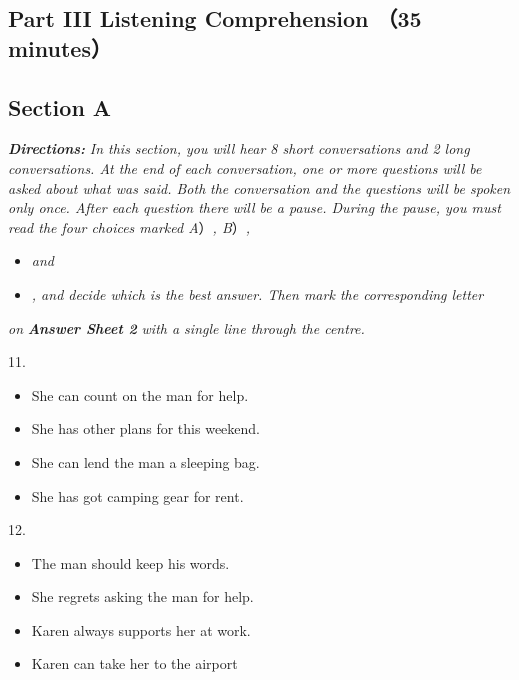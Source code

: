 \documentclass[UTF8,11pt]{ctexart}
\begin{document}
\subsection*{\textbf{Part III} \textbf{Listening Comprehension} （\textbf{35 minutes}）}


\subsection*{\textbf{Section A}}


\textbf{\textit{Directions:}}\textit{ In this section, you will hear 8 short conversations and 2 long conversations. At the end} \textit{of each conversation, one or more questions will be asked about what was said. Both} \textit{the conversation and the questions will be spoken only once. After each question there} \textit{will be a pause. During the pause, you must read the four choices marked A}）\textit{, B}）\textit{,}


\begin{itemize}[leftmargin=2em,itemsep=.2em,topsep=.4em]\item[C.] \textit{and}
\item[D.] \textit{, and decide which is the best answer. Then mark the corresponding letter}
\end{itemize}

\textit{on}\textbf{\textit{ Answer Sheet 2}}\textit{ with a single line through the centre.}


11.


\begin{itemize}[leftmargin=2em,itemsep=.2em,topsep=.4em]\item[A.] She can count on the man for help.
\item[B.] She has other plans for this weekend.
\item[C.] She can lend the man a sleeping bag.
\item[D.] She has got camping gear for rent.
\end{itemize}

12.


\begin{itemize}[leftmargin=2em,itemsep=.2em,topsep=.4em]\item[A.] The man should keep his words.
\item[B.] She regrets asking the man for help.
\item[C.] Karen always supports her at work.
\item[D.] Karen can take her to the airport
\end{itemize}
\end{document}
